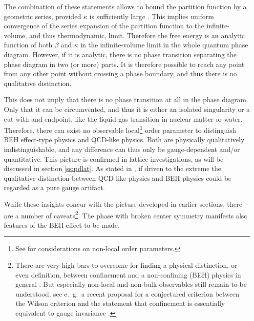 \documentclass[final,twoside,12pt]{article}
\newcommand*{\1}{1\!\!\!\bot}
\begin{document}
The combination of these statements allows to bound the partition function by a geometric series, provided $\kappa$ is sufficiently large \cite{Osterwalder:1977pc,Fradkin:1978dv}. This implies uniform convergence of the series expansion of the partition function to the infinite-volume, and thus thermodynamic, limit. Therefore the free energy is an analytic function of both $\beta$ and $\kappa$ in the infinite-volume limit in the whole quantum phase diagram. However, if it is analytic, there is no phase transition separating the phase diagram in two (or more) parts. It is therefore possible to reach any point from any other point without crossing a phase boundary, and thus there is no qualitative distinction.

This does not imply that there is no phase transition at all in the phase diagram. Only that it can be circumvented, and thus it is either an isolated singularity or a cut with and endpoint, like the liquid-gas transition in nuclear matter or water. Therefore, there can exist no observable local\footnote{See \cite{Greensite:2017ajx,Greensite:2018mhh} for considerations on non-local order parameters.} order parameter to distinguish BEH effect-type physics and QCD-like physics. Both are physically qualitatively indistinguishable, and any difference can thus only be gauge-dependent and/or quantitative. This picture is confirmed in lattice investigations, as will be discussed in section \ref{ss:pdlat}. As stated in \cite{Seiler:2015rwa}, if driven to the extreme the qualitative distinction between QCD-like physics and BEH physics could be regarded as a pure gauge artifact.

While these insights concur with the picture developed in earlier sections, there are a number of caveats\footnote{There are very high bars to overcome for finding a physical distinction, or even definition, between confinement and a non-confining (BEH) physics in general \cite{Seiler:2015rwa}. But especially non-local and non-bulk observables still remain to be understood, see e.\ g.\ a recent proposal for a conjectured criterion between the Wilson criterion and the statement that confinement is essentially equivalent to gauge invariance \cite{Greensite:2017ajx,Greensite:2018mhh}.}. The phase with broken center symmetry manifests also features of the BEH effect \cite{Lang:1981qg,Drouffe:1984hb,Baier:1986ni,Capri:2012cr} to be made.
\end{document}
